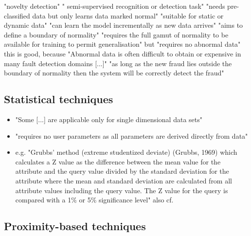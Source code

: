 \begin{itemize}
			\subitem "novelty detection" \parencite{Hodge2004} " semi-supervised recognition or detection task" \parencite{Hodge2004}
			\subitem "needs pre-classified data but only learns data marked normal" \parencite{Hodge2004}
			\subitem "suitable for static or dynamic data" \parencite{Hodge2004}
			\subitem "can learn the model incrementally as new data arrives" \parencite{Hodge2004}
			\subitem "aims to define a boundary of normality" \parencite{Hodge2004}
			\subitem "requires the full gamut of normality to be available for training to permit generalisation" \parencite{Hodge2004} but "requires no abnormal data" \parencite{Hodge2004}
			\subitem this is good, because "Abnormal data is often difficult to obtain or expensive in many fault detection domains [...]" \parencite{Hodge2004}
			\subitem "as long as the new fraud lies outside the boundary of normality then the system will be correctly detect the fraud" \parencite{Hodge2004}
		
	\end{itemize}

	\subsection{Statistical techniques}
	\label{sec:background:network:novelty:stat}
	
	\begin{itemize}
		\item "Some [...] are applicable only for single dimensional data sets" \parencite{Hodge2004}
		\item "requires no user parameters as all parameters are derived directly from data" \parencite{Hodge2004}
		\item e.g. "Grubbs’ method (extreme studentized deviate) (Grubbs, 1969) which calculates a Z value as the difference between the mean value for the attribute and the query value divided by the standard deviation for the attribute where the mean and standard deviation are calculated from all attribute values including the query value. The Z value for the query is compared with a 1\% or 5\% significance level" \parencite{Hodge2004} also cf. \textcite{Grubbs1969}
	\end{itemize}
	
	\subsection{Proximity-based techniques}
	\label{sec:background:network:novelty:prox}
	
